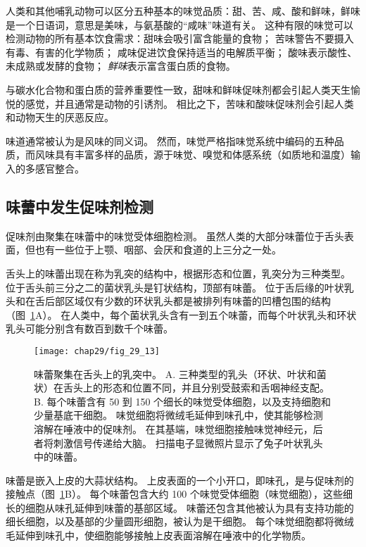 人类和其他哺乳动物可以区分五种基本的味觉品质：甜、苦、咸、酸和鲜味，鲜味是一个日语词，意思是美味，与氨基酸的“咸味”味道有关。
这种有限的味觉可以检测动物的所有基本饮食需求：甜味会吸引富含能量的食物；
苦味警告不要摄入有毒、有害的化学物质；
咸味促进饮食保持适当的电解质平衡；
酸味表示酸性、未成熟或发酵的食物；
\textit{鲜味}表示富含蛋白质的食物。


与碳水化合物和蛋白质的营养重要性一致，甜味和鲜味促味剂都会引起人类天生愉悦的感觉，并且通常是动物的引诱剂。
相比之下，苦味和酸味促味剂会引起人类和动物天生的厌恶反应。


味道通常被认为是风味的同义词。
然而，味觉严格指味觉系统中编码的五种品质，而风味具有丰富多样的品质，源于味觉、嗅觉和体感系统（如质地和温度）输入的多感官整合。



\subsection{味蕾中发生促味剂检测}

促味剂由聚集在味蕾中的味觉受体细胞检测。
虽然人类的大部分味蕾位于舌头表面，但也有一些位于上颚、咽部、会厌和食道的上三分之一处。


舌头上的味蕾出现在称为乳突的结构中，根据形态和位置，乳突分为三种类型。
位于舌头前三分之二的菌状乳头是钉状结构，顶部有味蕾。
位于舌后缘的叶状乳头和在舌后部区域仅有少数的环状乳头都是被排列有味蕾的凹槽包围的结构（图~\ref{fig:29_13}A）。
在人类中，每个菌状乳头含有一到五个味蕾，而每个叶状乳头和环状乳头可能分别含有数百到数千个味蕾。


\begin{figure}[htbp]
	\centering
	\texttt{[image: chap29/fig\_29\_13]}
	\caption{味蕾聚集在舌头上的乳突中。
		A. 三种类型的乳头（环状、叶状和菌状）在舌头上的形态和位置不同，并且分别受鼓索和舌咽神经支配。
		B. 每个味蕾含有 50 到 150 个细长的味觉受体细胞，以及支持细胞和少量基底干细胞。
		味觉细胞将微绒毛延伸到味孔中，使其能够检测溶解在唾液中的促味剂。
		在其基端，味觉细胞接触味觉神经元，后者将刺激信号传递给大脑。
		扫描电子显微照片显示了兔子叶状乳头中的味蕾。}
	\label{fig:29_13}
\end{figure}


味蕾是嵌入上皮的大蒜状结构。
上皮表面的一个小开口，即味孔，是与促味剂的接触点（图~\ref{fig:29_13}B）。
每个味蕾包含大约 100 个味觉受体细胞（味觉细胞），这些细长的细胞从味孔延伸到味蕾的基部区域。
味蕾还包含其他被认为具有支持功能的细长细胞，以及基部的少量圆形细胞，被认为是干细胞。
每个味觉细胞都将微绒毛延伸到味孔中，使细胞能够接触上皮表面溶解在唾液中的化学物质。


